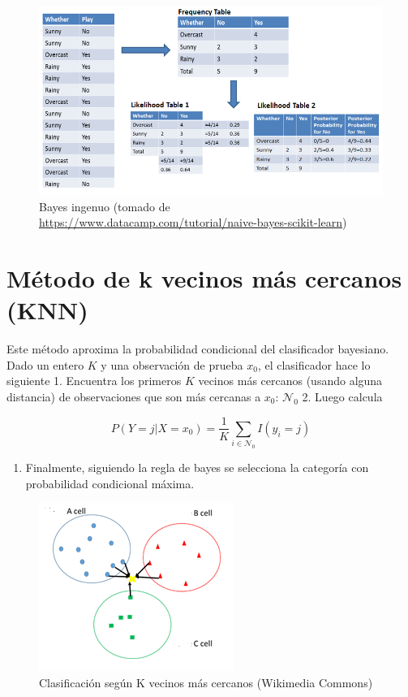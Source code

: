 \documentclass[
  12pt,
]{book}
\providecommand{\tightlist}{%
  \setlength{\itemsep}{0pt}\setlength{\parskip}{0pt}}
\theoremstyle{definition}
\theoremstyle{definition}
\theoremstyle{definition}
\theoremstyle{definition}
\theoremstyle{remark}
\begin{document}
\begin{figure}
\centering
\includegraphics{manual_figures/naivebayes.png}
\caption{Bayes ingenuo (tomado de \url{https://www.datacamp.com/tutorial/naive-bayes-scikit-learn})}
\end{figure}

\hypertarget{muxe9todo-de-k-vecinos-muxe1s-cercanos-knn}{%
\section{Método de k vecinos más cercanos (KNN)}\label{muxe9todo-de-k-vecinos-muxe1s-cercanos-knn}}

Este método aproxima la probabilidad condicional del clasificador bayesiano. Dado un entero \(K\) y una observación de prueba \(x_0\), el clasificador hace lo siguiente
1. Encuentra los primeros \(K\) vecinos más cercanos (usando alguna distancia) de observaciones que son más cercanas a \(x_0\): \(\mathcal N_0\)
2. Luego calcula

\[P(Y=j|X=x_0) = \frac{1}{K}\sum_{i \in \mathcal N_0}I(y_i=j)\]

\begin{enumerate}
\def\labelenumi{\arabic{enumi}.}
\setcounter{enumi}{2}
\tightlist
\item
  Finalmente, siguiendo la regla de bayes se selecciona la categoría con probabilidad condicional máxima.
\end{enumerate}

\begin{figure}
\centering
\includegraphics{manual_figures/KNN.png}
\caption{Clasificación según K vecinos más cercanos (Wikimedia Commons)}
\end{figure}
\end{document}

